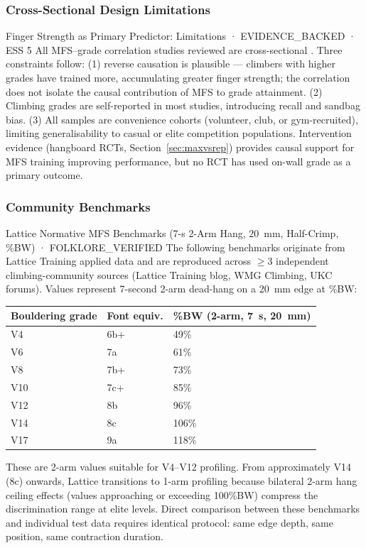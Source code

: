 \subsubsection{Cross-Sectional Design Limitations}

\begin{evidencebox}{Finger Strength as Primary Predictor: Limitations · EVIDENCE\_BACKED · ESS 5}
All MFS--grade correlation studies reviewed are cross-sectional \cite{MJPS00, BPMC11, BMK+25, BBW25, TEMP_Torr2022}. Three constraints follow: (1) reverse causation is plausible --- climbers with higher grades have trained more, accumulating greater finger strength; the correlation does not isolate the causal contribution of MFS to grade attainment. (2) Climbing grades are self-reported in most studies, introducing recall and sandbag bias. (3) All samples are convenience cohorts (volunteer, club, or gym-recruited), limiting generalisability to casual or elite competition populations. Intervention evidence (hangboard RCTs, Section~\ref{sec:maxvsrep}) provides causal support for MFS training improving performance, but no RCT has used on-wall grade as a primary outcome.
\end{evidencebox}

\subsubsection{Community Benchmarks}

\begin{folklorebox}{Lattice Normative MFS Benchmarks (7-s 2-Arm Hang, 20~mm, Half-Crimp, \%BW) · FOLKLORE\_VERIFIED}
The following benchmarks originate from Lattice Training applied data and are reproduced across $\geq$3 independent climbing-community sources (Lattice Training blog, WMG Climbing, UKC forums). Values represent 7-second 2-arm dead-hang on a 20~mm edge at \%BW:

\smallskip
\begin{tabular}{lll}
\toprule
\textbf{Bouldering grade} & \textbf{Font equiv.} & \textbf{\%BW (2-arm, 7~s, 20~mm)} \\
\midrule
V4  & 6b+ & 49\% \\
V6  & 7a  & 61\% \\
V8  & 7b+ & 73\% \\
V10 & 7c+ & 85\% \\
V12 & 8b  & 96\% \\
V14 & 8c  & 106\% \\
V17 & 9a  & 118\% \\
\bottomrule
\end{tabular}

\smallskip
These are 2-arm values suitable for V4--V12 profiling. From approximately V14 (8c) onwards, Lattice transitions to 1-arm profiling because bilateral 2-arm hang ceiling effects (values approaching or exceeding 100\%BW) compress the discrimination range at elite levels. Direct comparison between these benchmarks and individual test data requires identical protocol: same edge depth, same position, same contraction duration.
\end{folklorebox}

